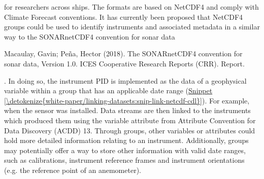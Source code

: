 \documentclass[a4paper,10pt,english]{sphinxmanual}
\begin{document}
for researchers across ships. The formats are based on NetCDF4 and
comply with Climate Forecast conventions. It has currently been
proposed that NetCDF4 groups could be used to identify instruments and
associated metadata in a similar way to the SONAR\sphinxhyphen{}netCDF4 convention
for sonar data%
\begin{footnote}[5]\sphinxAtStartFootnote
Macaulay, Gavin; Peña, Hector (2018). The SONAR\sphinxhyphen{}netCDF4 convention for
sonar data, Version 1.0. ICES Cooperative Research Reports (CRR).
Report. 
%
\end{footnote}. In doing so, the instrument PID is
implemented as the data of a geophysical variable within a group that
has an applicable date range (\hyperref[\detokenize{white-paper/linking-datasets:snip-link-netcdf-cdl}]{Snippet \ref{\detokenize{white-paper/linking-datasets:snip-link-netcdf-cdl}}}). For
example, when the sensor was installed. Data streams are then linked
to the instruments which produced them using the variable attribute
 from Attribute Convention for Data Discovery (ACDD) 1\sphinxhyphen{}3.
Through groups, other variables or attributes could hold more detailed
information relating to an instrument. Additionally, groups may
potentially offer a way to store other information with valid date
ranges, such as calibrations, instrument reference frames and
instrument orientations (e.g. the reference point of an anemometer).
\def\sphinxLiteralBlockLabel{\label{\detokenize{white-paper/linking-datasets:snip-link-netcdf-cdl}}}
\end{document}
